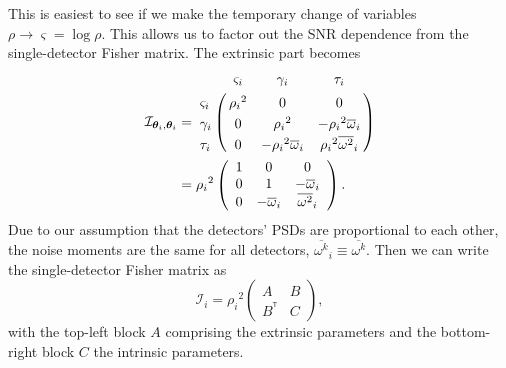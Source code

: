 \documentclass[amsmath,amssymb,aps,prx,reprint,nopreprintnumbers,nofootinbib]{revtex4-1}
\newcommand\transpose{\ensuremath{^{^\mathsf{T}}}}
\begin{document}
This is easiest to see if we make the temporary change of variables $\rho \rightarrow \varsigma = \log \rho$. This allows us to factor out the \ac{SNR} dependence from the single-detector Fisher matrix. The extrinsic part becomes
%
\begin{align}
    \mathcal{I}_{\bm\theta_i,\bm\theta_i} &= \bordermatrix{
        ~ & \varsigma_i & \gamma_i & \tau_i \cr
        \varsigma_i & {\rho_i}^2 & 0 & 0 \cr
        \gamma_i & 0 & {\rho_i}^2 & -{\rho_i}^2 {\overline{\omega}}_i \cr
        \tau_i & 0 & -{\rho_i}^2 {\overline{\omega}}_i & {\rho_i}^2 {\overline{\omega^2}}_i
    }
    \\
    \nonumber
    &= {\rho_i}^2 \left( \begin{array}{ccc}
        1 & 0 & 0 \\
        0 & 1 & -{\overline{\omega}}_i \\
        0 & -{\overline{\omega}}_i & {\overline{\omega^2}}_i
    \end{array} \right).
\end{align}
%
Due to our assumption that the detectors' \acp{PSD} are proportional to each other, the noise moments are the same for all detectors, ${\overline{\omega^k}}_i \equiv {\overline{\omega^k}}$. Then we can write the single-detector Fisher matrix as
%
\begin{equation}
    \mathcal{I}_i = {\rho_i}^2 \left(
        \begin{array}{cc}
            A & B \\
            B\transpose & C
        \end{array}
    \right),
\end{equation}
%
with the top-left block $A$ comprising the extrinsic parameters and the bottom-right block $C$ the intrinsic parameters.
\end{document}
